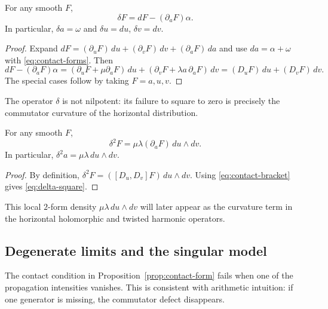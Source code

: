 \begin{lemma}\label{lemma:delta-projection}
For any smooth $F$,
\begin{equation}\label{eq:delta-projection}
\delta F=dF-(\partial_aF)\alpha.
\end{equation}
In particular, $\delta a=\omega$ and $\delta u=du$, $\delta v=dv$.
\end{lemma}

\begin{proof}
Expand $dF=(\partial_uF)\,du+(\partial_vF)\,dv+(\partial_aF)\,da$ and use $da=\alpha+\omega$ with \eqref{eq:contact-forms}. Then
\[
dF-(\partial_aF)\alpha
=(\partial_uF+\mu\partial_aF)\,du+(\partial_vF+\lambda a\,\partial_aF)\,dv
=(D_uF)\,du+(D_vF)\,dv.
\]
The special cases follow by taking $F=a,u,v$.
\end{proof}

The operator $\delta$ is not nilpotent: its failure to square to zero is precisely the commutator curvature of the horizontal distribution.

\begin{proposition}\label{prop:delta-square}
For any smooth $F$,
\begin{equation}\label{eq:delta-square}
\delta^2F=\mu\lambda(\partial_aF)\,du\wedge dv.
\end{equation}
In particular, $\delta^2a=\mu\lambda\,du\wedge dv$.
\end{proposition}

\begin{proof}
By definition, $\delta^2F=([D_u,D_v]F)\,du\wedge dv$. Using \eqref{eq:contact-bracket} gives \eqref{eq:delta-square}.
\end{proof}

This local $2$-form density $\mu\lambda\,du\wedge dv$ will later appear as the curvature term in the horizontal holomorphic and twisted harmonic operators.

\subsection{Degenerate limits and the singular model}\label{subsec:contact-degenerate}

The contact condition in Proposition~\ref{prop:contact-form} fails when one of the propagation intensities vanishes. This is consistent with arithmetic intuition: if one generator is missing, the commutator defect disappears.

